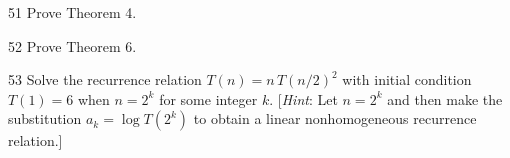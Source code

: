 \documentclass[11pt]{article}
\begin{document}

\begin{exercise}{51}
    Prove Theorem 4.
\end{exercise}

\begin{exercise}{52}
    Prove Theorem 6.
\end{exercise}

\begin{exercise}{53}
    Solve the recurrence relation $T(n) = n\,T(n/2)^2$ with initial
    condition $T(1) = 6$ when $n = 2^k$ for some integer $k$.
    [\emph{Hint}: Let $n = 2^k$ and then make the substitution
    $a_k = \log T(2^k)$ to obtain a linear nonhomogeneous recurrence
    relation.]
\end{exercise}
\end{document}
